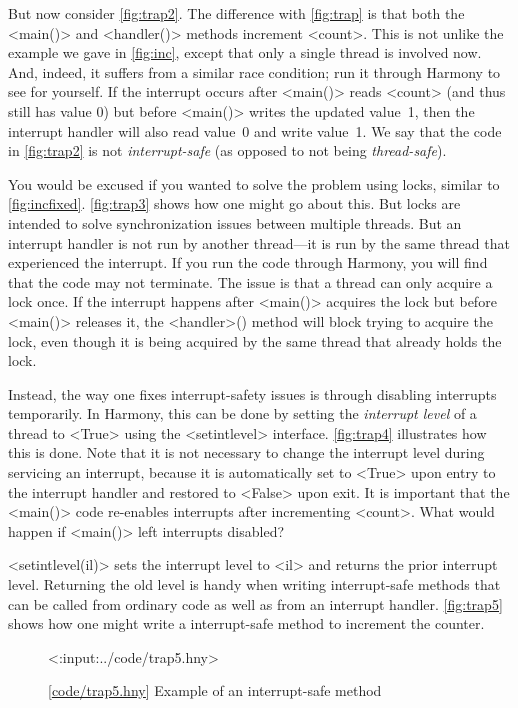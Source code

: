 \documentclass{report}
\newcommand{\harmonylink}[1]{%
[\href{https://harmony.cs.cornell.edu/#1}{\underline{#1}}]%
}
\newenvironment{code}{
\tcolorbox
}{
\endtcolorbox
}
\begin{document}
But now consider \autoref{fig:trap2}.  The difference with \autoref{fig:trap} is
that both the <{main()}> and <{handler()}> methods increment <{count}>.
This is not unlike the example we gave in \autoref{fig:inc}, except that only a single
thread is involved now.  And, indeed, it suffers from a similar race condition; run
it through Harmony to see for yourself.
If the interrupt occurs after <{main()}>
reads <{count}> (and thus still has value 0) but before <{main()}> writes the
updated value~1, then the interrupt handler will also read value~0 and write value~1.
We say that the code in \autoref{fig:trap2} is not \emph{interrupt-safe} (as opposed
to not being \emph{thread-safe}).

You would be excused if you wanted to solve the problem using locks,
similar to \autoref{fig:incfixed}.  \autoref{fig:trap3} shows how
one might go about this.  But locks are intended to solve synchronization
issues between multiple threads.  But an interrupt handler is not
run by another thread---it is run by the same thread that experienced
the interrupt.  If you run the code through Harmony, you will find
that the code may not terminate.  The issue is that a thread can
only acquire a lock once.  If the interrupt happens after <{main()}>
acquires the lock but before <{main()}> releases it, the <{handler}>()
method will block trying to acquire the lock, even though it is
being acquired by the same thread that already holds the lock.

Instead, the way one fixes interrupt-safety issues is through disabling interrupts
temporarily.  In Harmony, this can be done by setting the \emph{interrupt level}
of a thread to <{True}> using the <{setintlevel}> interface.
\autoref{fig:trap4} illustrates how this is done.
Note that it is not necessary to change the interrupt level during servicing an
interrupt, because it is automatically set to <{True}> upon entry to the interrupt
handler and restored to <{False}> upon exit.
It is important that the <{main()}> code re-enables interrupts after incrementing
<{count}>.  What would happen if <{main()}> left interrupts disabled?

<{setintlevel(il)}> sets the interrupt level to <{il}> and returns
the prior interrupt level.  Returning the old level is handy when writing interrupt-safe
methods that can be called from ordinary code as well as from an interrupt handler.
\autoref{fig:trap5} shows how one might write a interrupt-safe method
to increment the counter.

\begin{figure}
\begin{code}
<{:input:../code/trap5.hny}>
\end{code}
\caption{\harmonylink{code/trap5.hny} Example of an interrupt-safe method}
\label{fig:trap5}
\end{figure}
\end{document}

